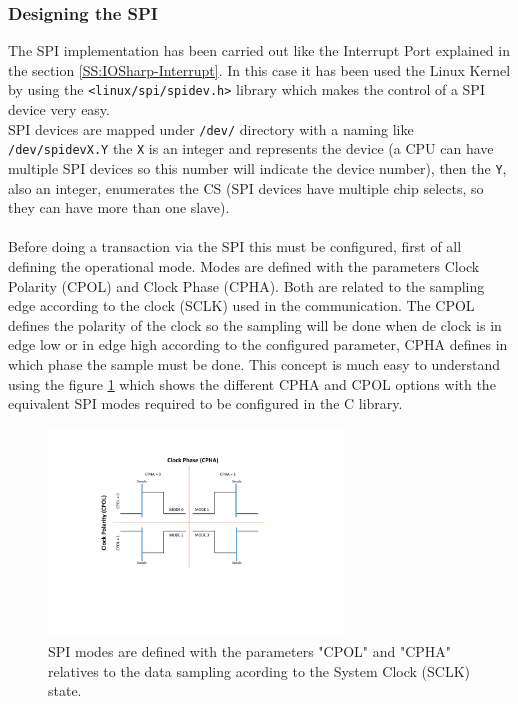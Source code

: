 \subsubsection{Designing the SPI}\label{SSS:IOSharp-SPI-Design}
The SPI implementation has been carried out like the Interrupt Port explained in the section \ref{SS:IOSharp-Interrupt}. In this case it has been used the Linux Kernel by using the \verb!<linux/spi/spidev.h>! library which makes the control of a SPI device very easy.
\\
SPI devices are mapped under \verb!/dev/! directory with a naming like \verb!/dev/spidevX.Y! the \verb!X! is an integer and represents the device (a CPU can have multiple SPI devices so this number will indicate the device number), then the \verb!Y!, also an integer, enumerates the \gls{CS} (SPI devices have multiple chip selects, so they can have more than one slave).
\\
\\
Before doing a transaction via the SPI this must be configured, first of all defining the operational mode. Modes are defined with the parameters Clock Polarity (CPOL) and Clock Phase (CPHA). Both are related to the sampling edge according to the clock (SCLK) used in the communication. The CPOL defines the polarity of the clock so the sampling will be done when de clock is in edge low or in edge high according to the configured parameter, CPHA defines in which phase the sample must be done. This concept is much easy to understand using the figure \ref{fig:spi-modes} which shows the different CPHA and CPOL options with the equivalent SPI modes required to be configured in the C library.

\begin{figure}[H]\begin{center}
 \centering
  \captionsetup{justification=centering}
  \includegraphics[width=0.7\textwidth]{pictures/iosharp/spi-modes}
  \caption{SPI modes are defined with the parameters "CPOL" and "CPHA" relatives to the data sampling acording to the System Clock (SCLK) state.\label{fig:spi-modes}}
\end{center}\end{figure}


